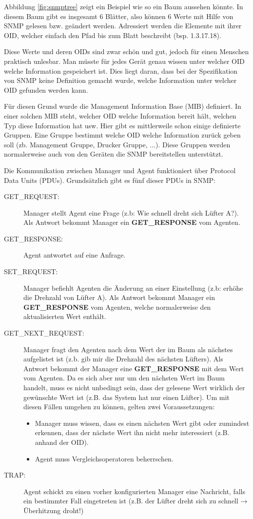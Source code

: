 Abbildung \ref{fig:snmptree} zeigt ein Beispiel wie so ein Baum aussehen könnte. In diesem Baum gibt es insgesamt 6 Blätter, also können 6 Werte mit Hilfe von SNMP gelesen bzw. geändert werden. Adressiert werden die Elemente mit ihrer OID, welcher einfach den Pfad bis zum Blatt beschreibt (bsp. 1.3.17.18).

Diese Werte und deren OIDs sind zwar schön und gut, jedoch für einen Menschen praktisch unlesbar. Man müsste für jedes Gerät genau wissen unter welcher OID welche Information gespeichert ist. Dies liegt daran, dass bei der Spezifikation von SNMP keine Definition gemacht wurde, welche Information unter welcher OID gefunden werden kann.

Für diesen Grund wurde die Management Information Base (MIB) definiert. In einer solchen MIB steht, welcher OID welche Information bereit hält, welchen Typ diese Information hat usw. Hier gibt es mittlerweile schon einige definierte Gruppen. Eine Gruppe bestimmt welche OID welche Information zurück geben soll (zb. Management Gruppe, Drucker Gruppe, ...). Diese Gruppen werden normalerweise auch von den Geräten die SNMP bereitstellen unterstützt.

Die Kommunikation zwischen Manager und Agent funktioniert über Protocol Data Units (PDUs). Grundsätzlich gibt es fünf dieser PDUs in SNMP:

\begin{description}
  \item[GET\_REQUEST:] Manager stellt Agent eine Frage (z.b: Wie schnell dreht sich Lüfter A?). Als Antwort bekommt Manager ein \textbf{GET\_RESPONSE} vom Agenten.
  \item[GET\_RESPONSE:] Agent antwortet auf eine Anfrage.
  \item[SET\_REQUEST:] Manager befiehlt Agenten die Änderung an einer Einstellung (z.b: erhöhe die Drehzahl von Lüfter A). Als Antwort bekommt Manager ein \textbf{GET\_RESPONSE} vom Agenten, welche normalerweise den aktualisierten Wert enthält.
  \item[GET\_NEXT\_REQUEST:] Manager fragt den Agenten nach dem Wert der im Baum als nächstes aufgelistet ist (z.b. gib mir die Drehzahl des nächsten Lüfters). Als Antwort bekommt der Manager eine \textbf{GET\_RESPONSE} mit dem Wert vom Agenten. Da es sich aber nur um den nächsten Wert im Baum handelt, muss es nicht unbedingt sein, dass der gelesene Wert wirklich der gewünschte Wert ist (z.B. das System hat nur einen Lüfter). Um mit diesen Fällen umgehen zu können, gelten zwei Voraussetzungen:
  \begin{itemize}
    \item Manager muss wissen, dass es einen nächsten Wert gibt oder zumindest erkennen, dass der nächste Wert ihn nicht mehr interessiert (z.B. anhand der OID).
    \item Agent muss Vergleichsoperatoren beherrschen.
  \end{itemize}
  \item[TRAP:] Agent schickt zu einen vorher konfigurierten Manager eine Nachricht, falls ein bestimmter Fall eingetreten ist (z.B. der Lüfter dreht sich zu schnell → Überhitzung droht!)
\end{description}

